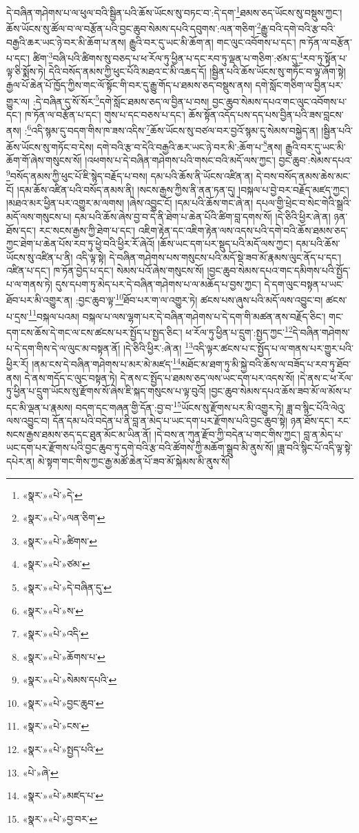 དེ་བཞིན་གཤེགས་པ་ལ་ཕུལ་བའི་སྦྱིན་པའི་ཆོས་ཡོངས་སུ་བཏང་བ་:དེ་དག་\footnote{«སྣར་»«པེ་»དེ་}ཐམས་ཅད་ཡོངས་སུ་བསྡུས་ཀྱང་། ཆོས་ཡོངས་སུ་ཚོལ་བ་ལ་བརྩོན་པའི་བྱང་ཆུབ་སེམས་དཔའི་དབུགས་:ལན་གཅིག་\footnote{«སྣར་»«པེ་»ལན་ཅིག་}རྒྱུ་བའི་དགེ་བའི་རྩ་བའི་བརྒྱའི་ཆར་ཡང་ཉེ་བར་མི་ཆོག་པ་ནས། རྒྱུའི་བར་དུ་ཡང་མི་ཆོག་ན། གང་ལུང་འབོགས་པ་དང་། ཁ་ཏོན་ལ་བརྩོན་པ་དང་། ཚིག་\footnote{«སྣར་»«པེ་»ཚིགས་}བཞི་པའི་ཚིགས་སུ་བཅད་པ་ཕ་རོལ་ཏུ་ཕྱིན་པ་དང་རབ་ཏུ་ལྡན་པ་གཅིག་:ཙམ་དུ་\footnote{«སྣར་»«པེ་»ཙམ་}རབ་ཏུ་སྟོན་པ་ལྟ་ཅི་སྨོས་ཏེ། དེའི་བསོད་ནམས་ཀྱི་ཕུང་པོའི་མཐའ་ང་མི་འཆད་དོ། །སྦྱིན་པའི་ཆོས་ཡོངས་སུ་གཏོང་བ་ལྟ་ཞོག་སྟེ། རྒྱལ་པོ་ཆེན་པོ་ཁྱོད་ཀྱིས་གང་ལོ་སྟོང་གི་བར་དུ་རྒྱུ་གོད་པ་ཐམས་ཅད་བསྡུས་ནས། དགེ་སློང་གཅིག་ལ་བྱིན་པར་གྱུར་ལ། :དེ་བཞིན་དུ་སོ་སོར་\footnote{«སྣར་»«པེ་»དེ་བཞིན་དུ་}དགེ་སློང་ཐམས་ཅད་ལ་བྱིན་པ་བས། བྱང་ཆུབ་སེམས་དཔའ་གང་ལུང་འབོགས་པ་དང་། ཁ་ཏོན་ལ་བརྩོན་པ་དང་། གུས་པ་དང་བཅས་པ་དང་། ཆོས་སྟོན་འདོད་པས་དད་པས་བྱིན་པའི་ཟས་བླངས་ནས། :\footnote{«སྣར་»«པེ་»ས་}འདི་སྙམ་དུ་བདག་གིས་ཁ་ཟས་འདིས་\footnote{«སྣར་»«པེ་»འདི་}ཆོས་ཡོངས་སུ་བཙལ་བར་བྱའོ་སྙམ་དུ་སེམས་བསྐྱེད་ན། །སྦྱིན་པའི་ཆོས་ཡོངས་སུ་གཏོང་བ་དེས། དགེ་བའི་རྩ་བ་དེའི་བརྒྱའི་ཆར་ཡང་ཉེ་བར་མི་:ཆོག་པ་\footnote{«སྣར་»«པེ་»ཆོགས་པ་}ནས། རྒྱུའི་བར་དུ་ཡང་མི་ཆོག་གོ་ཞེས་གསུངས་སོ། །འཕགས་པ་དེ་བཞིན་གཤེགས་པའི་གསང་བའི་མདོ་ལས་ཀྱང་། བྱང་ཆུབ་:སེམས་དཔའ་\footnote{«སྣར་»«པེ་»སེམས་དཔའི་}བསོད་ནམས་ཀྱི་ཕུང་པོ་ཇི་སྙེད་བརྗོད་པ་བས། དམ་པའི་ཆོས་ནི་ཡོངས་འཛིན་ན། དེ་བས་བསོད་ནམས་ཆེས་མང་ངོ། །དམ་ཆོས་འཛིན་པའི་བསོད་ནམས་ནི། །སངས་རྒྱས་ཀྱིས་ནི་ནན་ཏན་དུ། །བསྐལ་པ་བྱེ་བར་བརྗོད་མཛད་ཀྱང་། །མཐའ་མར་ཕྱིན་པར་འགྱུར་མ་ལགས། །ཞེས་འབྱུང་ངོ། །དམ་པའི་ཆོས་གང་ཞེ་ན། དཔལ་གྱི་ཕྲེང་བ་སེང་གེའི་སྒྲའི་མདོ་ལས་གསུངས་པ། དམ་པའི་ཆོས་ཞེས་བྱ་བ་དེ་ནི་ཐེག་པ་ཆེན་པོའི་ཚིག་བླ་དགས་སོ། །དེ་ཅིའི་ཕྱིར་ཞེ་ན། ཉན་ཐོས་དང་། རང་སངས་རྒྱས་ཀྱི་ཐེག་པ་དང་། འཇིག་རྟེན་དང་འཇིག་རྟེན་ལས་འདས་པའི་དགེ་བའི་ཆོས་ཐམས་ཅད་ཀྱང་ཐེག་པ་ཆེན་པོས་རབ་ཏུ་ཕྱེ་བའི་ཕྱིར་རོ་ཞེའོ། །ཆོས་ཡང་དག་པར་སྡུད་པའི་མདོ་ལས་ཀྱང་། དམ་པའི་ཆོས་ཡོངས་སུ་འཛིན་པ་ནི། འདི་ལྟ་སྟེ། དེ་བཞིན་གཤེགས་པས་གསུངས་པའི་མདོ་སྡེ་ཟབ་མོ་རྣམས་ལུང་ནོད་པ་དང་། འཛིན་པ་དང་། ཁ་ཏོན་བྱེད་པ་དང་། སེམས་པའོ་ཞེས་གསུངས་སོ། །བྱང་ཆུབ་སེམས་དཔའ་གང་དམིགས་པའི་སྤྱོད་པ་ལ་གནས་ཏེ། དུས་དཔག་ཏུ་མེད་པར་དེ་བཞིན་གཤེགས་པ་ལ་མཆོད་པ་བྱས་ཀྱང་། དེ་དག་ལུང་བསྟན་པ་ཡང་ཐོབ་པར་མི་འགྱུར་ན། :བྱང་ཆུབ་ལྟ་\footnote{«སྣར་»«པེ་»བྱང་ཆུབ་}ཐོབ་པར་ག་ལ་འགྱུར་ཏེ། ཚངས་པས་ཞུས་པའི་མདོ་ལས་འབྱུང་བ། ཚངས་པ་དྲས་\footnote{«སྣར་»«པེ་»ངས་}བསྐལ་པའམ། བསྐལ་པ་ལས་ལྷག་པར་དེ་བཞིན་གཤེགས་པ་དེ་དག་གི་མཚན་ནས་བརྗོད་ཅིང་། གང་དག་ངས་ཆོས་དེ་གང་ལ་ངས་ཚངས་པར་སྤྱོད་པ་སྤྱད་ཅིང་། ཕ་རོལ་ཏུ་ཕྱིན་པ་དྲུག་:སྤྱད་ཀྱང་\footnote{«སྣར་»«པེ་»སྤྱད་པའི་}དེ་བཞིན་གཤེགས་པ་དེ་དག་གིས་དེ་ལ་ལུང་མ་བསྟན་ནོ། །དེ་ཅིའི་ཕྱིར་:ཞེ་ན། \footnote{«པེ་»ཞེ་}འདི་ལྟར་ཚངས་པ་ང་སྤྱོད་པ་ལ་གནས་པར་གྱུར་པའི་ཕྱིར་རོ། །ནམ་ངས་དེ་བཞིན་གཤེགས་པ་མར་མེ་མཛད་\footnote{«སྣར་»«པེ་»མཛད་པ་}མཐོང་མ་ཐག་ཏུ་མི་སྐྱེ་བའི་ཆོས་ལ་བཟོད་པ་རབ་ཏུ་ཐོབ་ནས། དེ་ནས་གདོད་ང་ལུང་བསྟན་ཏེ། དེ་ནས་ང་སྤྱོད་པ་ཐམས་ཅད་ལས་ཡང་དག་པར་འདས་སོ། །དེ་ནས་ང་ཕ་རོལ་ཏུ་ཕྱིན་པ་དྲུག་ཡོངས་སུ་རྫོགས་སོ་ཞེས་ཇི་སྐད་གསུངས་པ་ལྟ་བུའོ། །བྱང་ཆུབ་སེམས་དཔའ་ཆོས་ཟབ་མོ་ལ་མོས་པ་དང་མི་ལྡན་པ་རྣམས། བདག་དང་གཞན་གྱི་དོན་:བྱ་བ་\footnote{«སྣར་»«པེ་»བྱ་བར་}ཡོངས་སུ་རྫོགས་པར་མི་འགྱུར་ཏེ། ཟླ་བ་སྙིང་པོའི་ལེའུ་ལས་འབྱུང་བ། དོན་དམ་པའི་བདེན་པ་ནི་བླ་ན་མེད་པ་ཡང་དག་པར་རྫོགས་པའི་བྱང་ཆུབ་སྟེ། ཉན་ཐོས་དང་། རང་སངས་རྒྱས་ཐམས་ཅད་དང་ཐུན་མོང་མ་ཡིན་ནོ། །དེ་བས་ན་ཀུན་རྫོབ་ཀྱི་བདེན་པ་གང་གིས་ཀྱང་། བླ་ན་མེད་པ་ཡང་དག་པར་རྫོགས་པའི་བྱང་ཆུབ་ཏུ་དགེ་བའི་རྩ་བའི་ཚོགས་ཀྱི་མཆོག་སྒྲུབ་མི་ནུས་སོ། །ཟླ་བའི་སྙིང་པོ་འདི་ལྟ་སྟེ་དཔེར་ན། མེ་སྟག་གང་གིས་ཀྱང་རྒྱ་མཚོ་ཆེན་པོ་ཟབ་མོ་སྐེམས་མི་ནུས་སོ། 